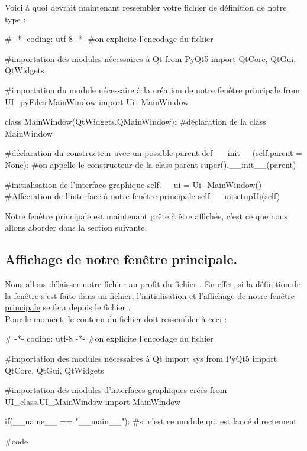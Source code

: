 {Voici à quoi devrait maintenant ressembler votre fichier de définition de notre type  :
\begin{Python}
# -*- coding: utf-8 -*-
#on explicite l’encodage du fichier

#importation des modules nécessaires à Qt
from PyQt5 import QtCore, QtGui, QtWidgets

#importation du module nécessaire à la création de notre fenêtre principale
from UI_pyFiles.MainWindow import Ui_MainWindow

class MainWindow(QtWidgets.QMainWindow): #déclaration de la class MainWindow

	#déclaration du constructeur avec un possible parent
	def __init__(self,parent = None):
		#on appelle le constructeur de la class parent
		super().__init__(parent)

		#initialisation de l'interface graphique
		self.__ui = Ui_MainWindow()
		#Affectation de l'interface à notre fenêtre principale
		self.__ui.setupUi(self)
\end{Python}


Notre fenêtre principale est maintenant prête à être affichée, c'est ce que nous allons aborder dans la section suivante.


\subsection{Affichage de notre fenêtre principale.}

Nous allons délaisser notre fichier  au profit du fichier . En effet, si la définition de la fenêtre s'est faite dans un fichier, l'initialisation et l'affichage de notre fenêtre \underline{principale} se fera depuis le fichier .\\

Pour le moment, le contenu du fichier  doit ressembler à ceci :
\begin{Python}
# -*- coding: utf-8 -*-
#on  explicite l’encodage  du  fichier

#importation des modules nécessaires à Qt
import sys
from PyQt5 import QtCore, QtGui, QtWidgets

#importation des modules d'interfaces graphiques créés
from UI_class.UI_MainWindow import MainWindow


if(__name__ == "__main__"): #si c'est ce module qui est lancé directement

	#code
\end{Python}

}
